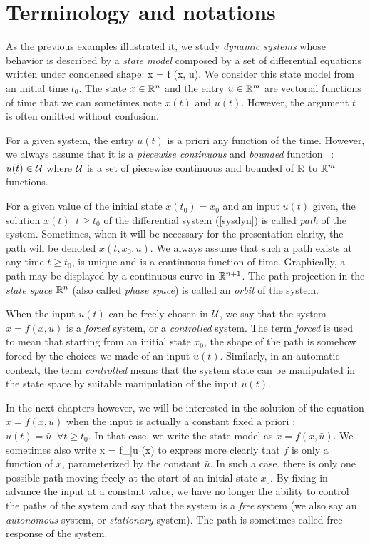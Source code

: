 \section{Terminology and notations}

As the previous examples illustrated it, we study {\em dynamic systems} whose behavior is described by a {\em state model} composed by a set of differential equations written under condensed shape:
\eqn
\dot x = f (x, u). \label{sysdyn}
\eeqn
We consider this state model from an initial time $t_0$. 
The state $x \in \mathbb{R}^n$ and the entry $u \in \mathbb{R}^m$ are vectorial functions of
time that we can sometimes note $x(t)$ and $u(t)$. However,
the argument $t$ is often omitted without confusion.

For a given system, the entry $u(t)$ is a priori any function of the time. However, we always assume that it is a {\em piecewise continuous} and {\em bounded} function ~: $u(t) \in {\cal U}$ where ${\cal U}$ is a set of piecewise continuous and
bounded of $\mathbb{R}$ to $\mathbb{R}^m$ functions.

For a given value of the initial state $x(t_0) = x_0$ and an input $u(t)$ given, the solution $x(t) \;\; t \geq t_0$ of the differential system
(\ref{sysdyn}) is called {\em path} of the system. Sometimes, when it
will be necessary for the presentation clarity, the path will be denoted
$x(t, x_0, u)$. We always assume that such a path exists
at any time $t \geq t_0$, is unique and is a continuous function of time.
Graphically, a path may be displayed by a continuous curve in $\mathbb{R}^{n+1}$. The path projection in the
{\em state space} $\mathbb{R}^n$ (also called {\em phase space}) is called
an {\em orbit} of the system.

When the input $u(t)$ can be freely chosen in ${\cal U}$, we say
that the system $\dot x = f(x,u)$ is a {\em forced} system, or a {\em controlled} system. The term {\em forced} is used to
mean that starting from an initial state $x_0$, the shape of the path
is somehow forced by the choices we made of an input $u(t)$. Similarly, in an automatic context, the term {\em controlled}
means that the system state can be manipulated in the state space by suitable manipulation of the input $u(t)$.

In the next chapters however, we will be interested in the solution of the equation $\dot x = f(x,u)$ when the input is
actually a constant fixed a priori : $u(t) = \bar u \;\; \forall t \geq
t_0$.  In that case, we write the state model as $\dot x = f(x,
\bar u)$.  We sometimes also write 
\eqnn
\dot x = f_{\bar u} (x)
\eeqnn
to express more clearly that $f$ is only a function of $x$,
parameterized by the constant $\bar u$. In such a case, there is
only one possible path moving freely at the start of an initial state  $x_0$. By fixing in advance the input at a constant value, we have no longer the ability to control the paths of the system and say that
the system is a {\em free} system (we also say an {\em autonomous} system, or
{\em stationary} system). The path is sometimes called {free response} of the system.

